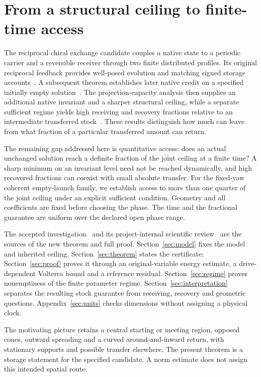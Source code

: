\section{From a structural ceiling to finite-time access}\label{sec:introduction}
The reciprocal chiral exchange candidate couples a native state to a periodic carrier and a reversible receiver through two finite distributed profiles. Its original reciprocal feedback provides well-posed evolution and matching signed storage accounts~\cite{p1}. A subsequent theorem establishes later native credit on a specified initially empty solution~\cite{p2}. The projection-capacity analysis then supplies an additional native invariant and a sharper structural ceiling, while a separate sufficient regime yields high receiving and recovery fractions relative to an intermediate transferred stock~\cite{p3}. These results distinguish how much can leave from what fraction of a particular transferred amount can return.

The remaining gap addressed here is quantitative access: does an actual unchanged solution reach a definite fraction of the joint ceiling at a finite time? A sharp minimum on an invariant level need not be reached dynamically, and high recovered fractions can coexist with small absolute transfer. For the fixed-yaw coherent empty-launch family, we establish access to more than one quarter of the joint ceiling under an explicit sufficient condition. Geometry and all coefficients are fixed before choosing the phase. The time and the fractional guarantee are uniform over the declared open phase range.

The accepted investigation~\cite{fa} and its project-internal scientific review~\cite{fareview} are the sources of the new theorem and full proof. Section~\ref{sec:model} fixes the model and inherited ceiling. Section~\ref{sec:theorem} states the certificate; Section~\ref{sec:proof} proves it through an original-variable energy estimate, a drive-dependent Volterra bound and a reference residual. Section~\ref{sec:regime} proves nonemptiness of the finite parameter regime. Section~\ref{sec:interpretation} separates the resulting stock guarantee from receiving, recovery and geometric questions. Appendix~\ref{sec:units} checks dimensions without assigning a physical clock.

The motivating picture retains a central starting or meeting region, opposed cones, outward spreading and a curved around-and-inward return, with stationary supports and possible transfer elsewhere. The present theorem is a storage statement for the specified candidate. A norm estimate does not assign this intended spatial route.
